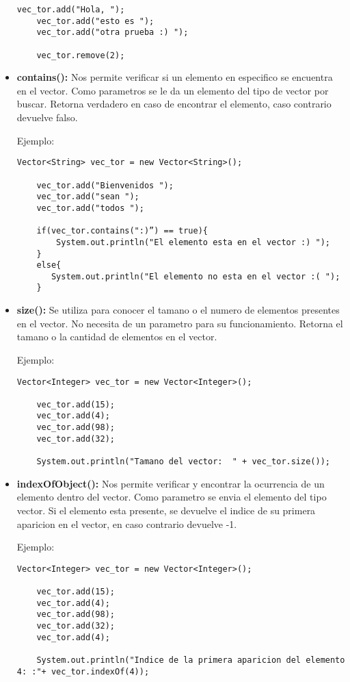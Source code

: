 \documentclass[12pt, letterpaper]{article} %
\begin{document}
\begin{itemize}
\begin{lstlisting}[frame=single]
    vec_tor.add("Hola, ");
    vec_tor.add("esto es ");
    vec_tor.add("otra prueba :) ");

    vec_tor.remove(2);
    \end{lstlisting}

    \item \textbf{contains():} Nos permite verificar si un elemento en especifico se encuentra en el vector. Como parametros se le da un elemento del tipo de vector por buscar. Retorna verdadero en caso de encontrar el elemento, caso contrario devuelve falso.

    Ejemplo:
    \lstset{language = Java, breaklines=true, basicstyle=\footnotesize}
    \begin{lstlisting}[frame=single]
    Vector<String> vec_tor = new Vector<String>();

    vec_tor.add("Bienvenidos ");
    vec_tor.add("sean ");
    vec_tor.add("todos ");

    if(vec_tor.contains(":)”) == true){
        System.out.println("El elemento esta en el vector :) ");
    }
    else{
	   System.out.println("El elemento no esta en el vector :( ");
    }
    \end{lstlisting}

    \item \textbf{size():} Se utiliza para conocer el tamano o el numero de elementos presentes en el vector. No necesita de un parametro para su funcionamiento. Retorna el tamano o la cantidad de elementos en el vector.

    Ejemplo:
    \lstset{language = Java, breaklines=true, basicstyle=\footnotesize}
    \begin{lstlisting}[frame=single]
    Vector<Integer> vec_tor = new Vector<Integer>();

    vec_tor.add(15);
    vec_tor.add(4);
    vec_tor.add(98);
    vec_tor.add(32);

    System.out.println("Tamano del vector:  " + vec_tor.size());
    \end{lstlisting}
    
    \item \textbf{indexOfObject():} Nos permite verificar y encontrar la ocurrencia de un elemento dentro del vector. Como parametro se envia el elemento del tipo vector. Si el elemento esta presente, se devuelve el indice de su primera aparicion en el vector, en caso contrario devuelve -1.
    
    Ejemplo:
    \lstset{language = Java, breaklines=true, basicstyle=\footnotesize}
    \begin{lstlisting}[frame=single]
    Vector<Integer> vec_tor = new Vector<Integer>();

    vec_tor.add(15);
    vec_tor.add(4);
    vec_tor.add(98);
    vec_tor.add(32);
    vec_tor.add(4);

    System.out.println("Indice de la primera aparicion del elemento 4: :"+ vec_tor.indexOf(4));
    \end{lstlisting}
\end{itemize}
\end{document}
